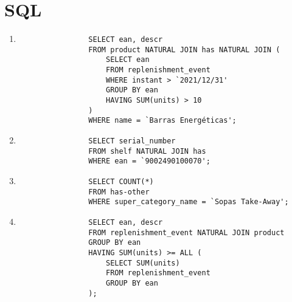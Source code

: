\documentclass{article}
\begin{document}
	\vspace{5mm}

	\section*{SQL}

	\begin{enumerate}[label=\arabic*)]
		\item
			\begin{verbatim}
				SELECT ean, descr
				FROM product NATURAL JOIN has NATURAL JOIN (
				    SELECT ean
				    FROM replenishment_event
				    WHERE instant > `2021/12/31'
				    GROUP BY ean
				    HAVING SUM(units) > 10
				)
				WHERE name = `Barras Energéticas';
			\end{verbatim}

		\vspace{5mm}

		\item
			\begin{verbatim}
				SELECT serial_number
				FROM shelf NATURAL JOIN has
				WHERE ean = `9002490100070';
			\end{verbatim}

		\vspace{5mm}

		\item
			\begin{verbatim}
				SELECT COUNT(*)
				FROM has-other
				WHERE super_category_name = `Sopas Take-Away';
			\end{verbatim}

		\vspace{5mm}

		\item
			\begin{verbatim}
				SELECT ean, descr
				FROM replenishment_event NATURAL JOIN product
				GROUP BY ean
				HAVING SUM(units) >= ALL (
				    SELECT SUM(units)
				    FROM replenishment_event
				    GROUP BY ean
				);
			\end{verbatim}
	\end{enumerate}
\end{document}
